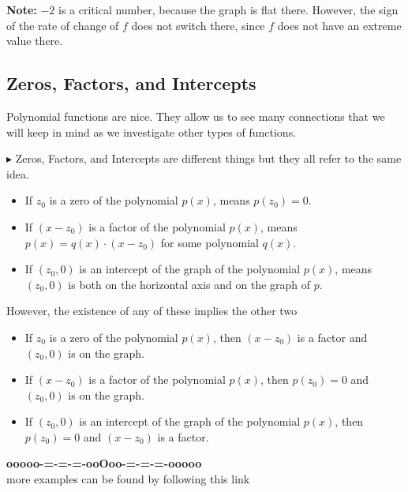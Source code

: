 \documentclass{ximera}
\begin{document}
\textbf{Note:} $-2$ is a critical number, because the graph is flat there.  However, the sign of the rate of change of $f$ does not switch there, since $f$ does not have an extreme value there.










\subsection*{Zeros, Factors, and Intercepts}




Polynomial functions are nice.  They allow us to see many connections that we will keep in mind as we investigate other types of functions.


\textbf{\textcolor{red!90!darkgray}{$\blacktriangleright$}} Zeros, Factors, and Intercepts are different things but they all refer to the same idea.





\begin{itemize}

\item If $z_0$ is a zero of the polynomial $p(x)$, means $p(z_0)=0$.


\item If $(x-z_0)$ is a factor of the polynomial $p(x)$, means $p(x) = q(x) \cdot (x-z_0)$ for some polynomial $q(x)$.


\item If $(z_0,0)$ is an intercept of the graph of the polynomial $p(x)$, means $(z_0,0)$ is both on the horizontal axis and on the graph of $p$.

\end{itemize}


However, the existence of any of these implies the other two






\begin{itemize}

\item If $z_0$ is a zero of the polynomial $p(x)$, then $(x-z_0)$ is a factor and $(z_0,0)$ is on the graph.


\item If $(x-z_0)$ is a factor of the polynomial $p(x)$, then $p(z_0)=0$ and $(z_0,0)$ is on the graph.


\item If $(z_0,0)$ is an intercept of the graph of the polynomial $p(x)$, then $p(z_0)=0$ and $(x-z_0)$ is a factor.

\end{itemize}














\begin{center}
\textbf{\textcolor{green!50!black}{ooooo-=-=-=-ooOoo-=-=-=-ooooo}} \\

more examples can be found by following this link\\ 

\end{center}
\end{document}
